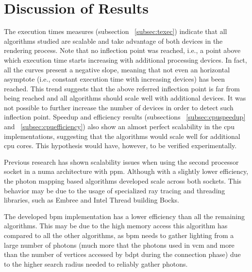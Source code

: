 \section{Discussion of Results}

The execution times measures (subsection ~\ref{subsec:texec}) indicate that all algorithms studied are scalable and take advantage of both devices in the rendering process. Note that no inflection point was reached, i.e., a point above which execution time starts increasing with additional processing devices. In fact, all the curves present a negative slope, meaning that not even an horizontal asymptote (i.e., constant execution time with increasing devices) has been reached. This trend suggests that the above referred inflection point is far from being reached and all algorithms should scale well with additional devices. It was not possible to further increase the number of devices in order to detect such inflection point. Speedup and efficiency results (subsections ~\ref{subsec:cpuspeedup} and ~\ref{subsec:cpuefficiency}) also show an almost perfect scalability in the \gls{cpu} implementations, suggesting that the algorithms would scale well for additional \gls{cpu} cores. This hypothesis would have, however, to be verified experimentally.

Previous research \citep{Palhas2013} has shown scalability issues when using the second processor socket in a \gls{numa} architecture with \gls{ppm}. Although with a slightly lower efficiency, the photon mapping based algorithms developed scale across both sockets. This behavior may be due to the usage of specialized ray tracing and threading libraries, such as Embree and Intel Thread building Bocks.

The developed \gls{bpm} implementation has a lower efficiency than all the remaining algorithms. This may be due to the high memory access this algorithm has compared to all the other algorithms, as \gls{bpm} needs to gather lighting from a large number of photons (much more that the photons used in \gls{vcm} and more than the number of vertices accessed by \gls{bdpt} during the connection phase) due to the higher search radius needed to reliably gather photons.

